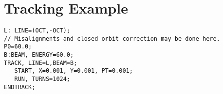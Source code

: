 \section{Tracking Example}
\label{sec:trackxmpl}

\begin{verbatim}
L: LINE=(OCT,-OCT);
// Misalignments and closed orbit correction may be done here.
P0=60.0;
B:BEAM, ENERGY=60.0;
TRACK, LINE=L,BEAM=B;
   START, X=0.001, Y=0.001, PT=0.001;
   RUN, TURNS=1024;
ENDTRACK;
\end{verbatim}


